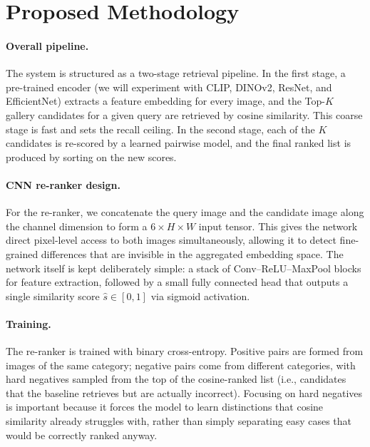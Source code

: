 \documentclass[12pt]{article}
\begin{document}
\section{Proposed Methodology}

\paragraph{Overall pipeline.}
The system is structured as a two-stage retrieval pipeline. In the first stage, a pre-trained encoder (we will experiment with CLIP, DINOv2, ResNet, and EfficientNet) extracts a feature embedding for every image, and the Top-$K$ gallery candidates for a given query are retrieved by cosine similarity. This coarse stage is fast and sets the recall ceiling. In the second stage, each of the $K$ candidates is re-scored by a learned pairwise model, and the final ranked list is produced by sorting on the new scores.

\paragraph{CNN re-ranker design.}
For the re-ranker, we concatenate the query image and the candidate image along the channel dimension to form a $6 \times H \times W$ input tensor. This gives the network direct pixel-level access to both images simultaneously, allowing it to detect fine-grained differences that are invisible in the aggregated embedding space. The network itself is kept deliberately simple: a stack of Conv--ReLU--MaxPool blocks for feature extraction, followed by a small fully connected head that outputs a single similarity score $\hat{s} \in [0, 1]$ via sigmoid activation.

\paragraph{Training.}
The re-ranker is trained with binary cross-entropy. Positive pairs are formed from images of the same category; negative pairs come from different categories, with hard negatives sampled from the top of the cosine-ranked list (i.e., candidates that the baseline retrieves but are actually incorrect). Focusing on hard negatives is important because it forces the model to learn distinctions that cosine similarity already struggles with, rather than simply separating easy cases that would be correctly ranked anyway.

\end{document}
